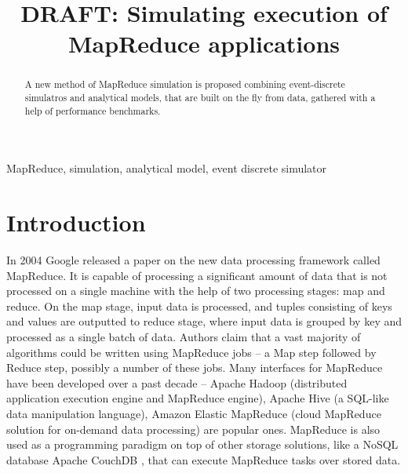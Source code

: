 \documentclass[conference]{IEEEtran} \IEEEoverridecommandlockouts
\begin{document}
 \title{DRAFT: Simulating execution of MapReduce applications}

    \author{ 
    }

    \maketitle

    \begin{abstract} 
    A new method of MapReduce simulation is proposed combining
    event-discrete simulatros and analytical models, that are built on the fly
    from data, gathered with a help of performance benchmarks.
    \end{abstract}

    \begin{IEEEkeywords} 
        MapReduce, simulation, analytical model, event discrete simulator
    \end{IEEEkeywords}

    \section{Introduction}
    In 2004 Google released a paper \cite{google_mapreduce} on the new data
    processing framework called MapReduce. It is capable of processing a
    significant amount of data that is not processed on a single machine with
    the help of two processing stages: map and reduce. On the map stage, input
    data is processed, and tuples consisting of keys and values are outputted
    to reduce stage, where input data is grouped by key and processed as a
    single batch of data. Authors claim that a vast majority of algorithms
    could be written using MapReduce jobs -- a Map step followed by Reduce
    step, possibly a number of these jobs. Many interfaces for MapReduce have
    been developed over a past decade -- Apache Hadoop \cite{apache_hadoop}
    (distributed application execution engine and MapReduce engine), Apache
    Hive \cite{apache_hive} (a SQL-like data manipulation language), Amazon
    Elastic MapReduce \cite{amazon_emr} (cloud MapReduce solution for on-demand
    data processing) are popular ones. MapReduce is also used as a programming
    paradigm on top of other storage solutions, like a NoSQL database Apache
    CouchDB \cite{apache_couchdb}, that can execute MapReduce tasks over stored
    data.
\end{document}
